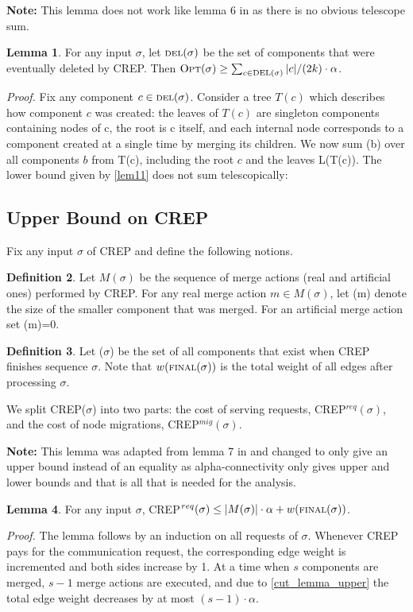 \documentclass[xcolor=dvipsnames, tikz, 11pt]{article}
\newcommand{\nl}{\newline}
\newcommand{\crep}{C{\scriptsize REP}}
\newcommand{\size}{\text{\scriptsize SIZE}}
\newcommand{\del}{\text{\scriptsize DEL}}
\newcommand{\final}{\text{\scriptsize FINAL}}
\newcommand{\opt}{\text{O{\scriptsize PT}}}
\theoremstyle{definition}
\newtheorem{defi}{Definition}
\newtheorem{lemma}[defi]{Lemma}
\begin{document}
\textbf{Note:} This lemma does not work like lemma 6 in \cite{Avin2015} as there is no obvious telescope sum.
	\begin{lemma}
		For any input $\sigma$, let $\del(\sigma)$ be the set of components that were eventually deleted by \crep{}. Then $\opt(\sigma)\geq\sum_{c\in\del(\sigma)}|c|/(2k)\cdot\alpha$.
	\end{lemma}
	\textit{Proof.} Fix any component $c\in\del(\sigma)$. Consider a tree $T(c)$ which describes how component $c$ was created: the leaves of $T(c)$ are singleton components containing nodes of c, the root is c itself, and each internal node corresponds to a component created at a single time by merging its children.
	We now sum \opt(b) over all components $b$ from T(c), including the root $c$ and the leaves L(T(c)).
	The lower bound given by \cref{lem11} does not sum telescopically:


	\subsection{Upper Bound on \crep{}}
	Fix any input $\sigma$ of \crep{} and define the following notions.
	\begin{defi}
		Let $M(\sigma)$ be the sequence of merge actions (real and artificial ones) performed by \crep{}. For any real merge action $m\in M(\sigma)$, let \size(m) denote the size of the smaller component that was merged. For an artificial merge action set \size(m)=0.
	\end{defi}

\begin{defi}
	Let \final($\sigma$) be the set of all components that exist when \crep{} finishes sequence $\sigma$. Note that $w(\final(\sigma))$ is the total weight of all edges after processing $\sigma$.
\end{defi}

We split \crep{}($\sigma$) into two parts: the cost of serving requests, \crep{}$^{req}(\sigma)$, and the cost of node migrations, \crep{}$^{mig}(\sigma)$.\nl


\textbf{Note:} This lemma was adapted from lemma 7 in \cite{Avin2015} and changed to only give an upper bound instead of an equality as alpha-connectivity only gives upper and lower bounds and that is all that is needed for the analysis.
\begin{lemma}
	For any input $\sigma$, \crep{}$^{req}(\sigma)\leq|M(\sigma)|\cdot\alpha+w(\final(\sigma))$.
\end{lemma}
\textit{Proof.} The lemma follows by an induction on all requests of $\sigma$. Whenever \crep{} pays for the communication request, the corresponding edge weight is incremented and both sides increase by 1.
At a time when $s$ components are merged, $s-1$ merge actions are executed, and due to \cref{cut_lemma_upper} the total edge weight decreases by at most $(s-1)\cdot\alpha$.
\end{document}
